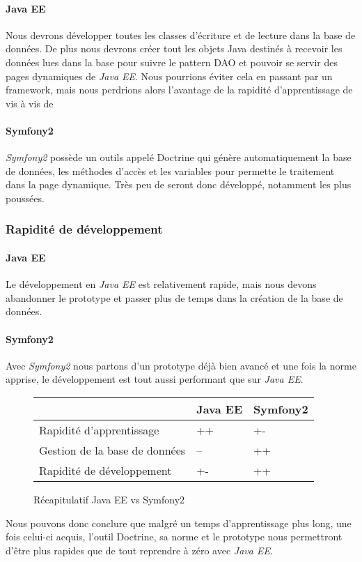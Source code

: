 \paragraph{Java EE}
Nous devrons développer toutes les classes d'écriture et de lecture dans la base de données. De plus nous devrons créer tout les objets Java destinés à recevoir les données lues dans la base pour suivre le pattern DAO et pouvoir se servir des pages dynamiques de \textit{Java EE}.
Nous pourrions éviter cela en passant par un framework, mais nous perdrions alors l'avantage de la rapidité d'apprentissage de \jee vis à vis de \symfony

\paragraph{Symfony2}
\textit{Symfony2} possède un outils appelé Doctrine qui génère automatiquement la base de données, les méthodes d'accès et les variables pour permette le traitement dans la page dynamique. Très peu de seront donc développé, notamment les plus poussées.

\subsubsection{Rapidité de développement}
\paragraph{Java EE}
Le développement en \textit{Java EE} est relativement rapide, mais nous devons abandonner le prototype et passer plus de temps dans la création de la base de données.

\paragraph{Symfony2}
Avec \textit{Symfony2} nous partons d'un prototype déjà bien avancé et une fois la norme apprise, le développement est tout aussi performant que sur \textit{Java EE}.

\begin{figure}[h]
\begin{center}
\begin{tabular}{|m{180pt}|m{50pt}|m{50pt}|}
	\hline
	\null & \textbf{Java EE} & \textbf{Symfony2} \\
	\hline
	Rapidité d'apprentissage & ++ & +-\\
	\hline
	Gestion de la base de données & -- & ++\\
	\hline
	Rapidité de développement & +- & ++ \\
	\hline
\end{tabular} \vspace*{5mm}
\caption{Récapitulatif Java EE vs Symfony2}
\end{center}
\end{figure}
Nous pouvons donc conclure que malgré un temps d'apprentissage plus long, une fois celui-ci acquis, l'outil Doctrine, sa norme et le prototype nous permettront d'être plus rapides que de tout reprendre à zéro avec \textit{Java EE}.

